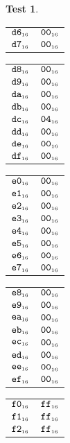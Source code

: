 \documentclass[a4paper,12pt]{article}
\makeatletter
\newcommand{\num}[1]{\texttt{\MakeLowercase{#1}}}
\newcommand{\hex}[1]{\num{#1}_{\textup{\tiny 16}}}
\newcommand{\MEM}[1]{\ifthenelse{\equal{#1}{}}{M}{M[#1]}}
\theoremstyle{definition}
\newtheorem{test}{Test}
\newenvironment{memtable}{%
  \begin{trivlist}
    \item
    }{%
    \end{trivlist}}
\newenvironment{memcolumn}{%
  \begin{tabular}{@{}ll@{}}
    \hline}
    {%
    \hline
  \end{tabular}}
\newcommand{\memspace}{\qquad}
\makeatother
\begin{document}
\begin{test}
\begin{memtable}
\begin{memcolumn}
      $\hex{D6}$ & $\hex{00}$ \\
      $\hex{D7}$ & $\hex{00}$ \\
    \end{memcolumn}
    \memspace
    \begin{memcolumn}
      $\hex{D8}$ & $\hex{00}$ \\
      $\hex{D9}$ & $\hex{00}$ \\
      $\hex{DA}$ & $\hex{00}$ \\
      $\hex{DB}$ & $\hex{00}$ \\
      $\hex{DC}$ & $\hex{04}$ \\
      $\hex{DD}$ & $\hex{00}$ \\
      $\hex{DE}$ & $\hex{00}$ \\
      $\hex{DF}$ & $\hex{00}$ \\
    \end{memcolumn}
    \memspace
    \begin{memcolumn}
      $\hex{E0}$ & $\hex{00}$ \\
      $\hex{E1}$ & $\hex{00}$ \\
      $\hex{E2}$ & $\hex{00}$ \\
      $\hex{E3}$ & $\hex{00}$ \\
      $\hex{E4}$ & $\hex{00}$ \\
      $\hex{E5}$ & $\hex{00}$ \\
      $\hex{E6}$ & $\hex{00}$ \\
      $\hex{E7}$ & $\hex{00}$ \\
    \end{memcolumn}
    \memspace
    \begin{memcolumn}
      $\hex{E8}$ & $\hex{00}$ \\
      $\hex{E9}$ & $\hex{00}$ \\
      $\hex{EA}$ & $\hex{00}$ \\
      $\hex{EB}$ & $\hex{00}$ \\
      $\hex{EC}$ & $\hex{00}$ \\
      $\hex{ED}$ & $\hex{00}$ \\
      $\hex{EE}$ & $\hex{00}$ \\
      $\hex{EF}$ & $\hex{00}$ \\
    \end{memcolumn}
    \memspace
    \begin{memcolumn}
      $\hex{F0}$ & $\hex{FF}$ \\
      $\hex{F1}$ & $\hex{FF}$ \\
      $\hex{F2}$ & $\hex{FF}$ \\

\end{memcolumn}
\end{memtable}
\end{test}
\end{document}
